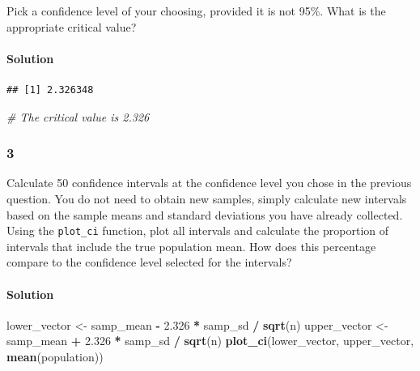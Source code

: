 \documentclass[]{article}
\newenvironment{Shaded}{\begin{snugshade}}{\end{snugshade}}
\newcommand{\KeywordTok}[1]{\textcolor[rgb]{0.13,0.29,0.53}{\textbf{#1}}}
\newcommand{\DecValTok}[1]{\textcolor[rgb]{0.00,0.00,0.81}{#1}}
\newcommand{\FloatTok}[1]{\textcolor[rgb]{0.00,0.00,0.81}{#1}}
\newcommand{\StringTok}[1]{\textcolor[rgb]{0.31,0.60,0.02}{#1}}
\newcommand{\CommentTok}[1]{\textcolor[rgb]{0.56,0.35,0.01}{\textit{#1}}}
\newcommand{\OperatorTok}[1]{\textcolor[rgb]{0.81,0.36,0.00}{\textbf{#1}}}
\newcommand{\NormalTok}[1]{#1}
\let\oldparagraph\paragraph
\renewcommand{\paragraph}[1]{\oldparagraph{#1}\mbox{}}
\begin{document}
Pick a confidence level of your choosing, provided it is not 95\%. What
is the appropriate critical value?

\paragraph{Solution}\label{solution-6}

\begin{Shaded}
\end{Shaded}

\begin{verbatim}
## [1] 2.326348
\end{verbatim}

\begin{Shaded}
\begin{Highlighting}[]
\CommentTok{# The critical value is 2.326}
\end{Highlighting}
\end{Shaded}

\subsubsection{3}\label{section-2}

Calculate 50 confidence intervals at the confidence level you chose in
the previous question. You do not need to obtain new samples, simply
calculate new intervals based on the sample means and standard
deviations you have already collected. Using the \texttt{plot\_ci}
function, plot all intervals and calculate the proportion of intervals
that include the true population mean. How does this percentage compare
to the confidence level selected for the intervals?

\paragraph{Solution}\label{solution-7}

\begin{Shaded}
\begin{Highlighting}[]
\NormalTok{lower_vector <-}\StringTok{ }\NormalTok{samp_mean }\OperatorTok{-}\StringTok{ }\FloatTok{2.326} \OperatorTok{*}\StringTok{ }\NormalTok{samp_sd }\OperatorTok{/}\StringTok{ }\KeywordTok{sqrt}\NormalTok{(n) }
\NormalTok{upper_vector <-}\StringTok{ }\NormalTok{samp_mean }\OperatorTok{+}\StringTok{ }\FloatTok{2.326} \OperatorTok{*}\StringTok{ }\NormalTok{samp_sd }\OperatorTok{/}\StringTok{ }\KeywordTok{sqrt}\NormalTok{(n)}
\KeywordTok{plot_ci}\NormalTok{(lower_vector, upper_vector, }\KeywordTok{mean}\NormalTok{(population))}
\end{Highlighting}
\end{Shaded}
\end{document}
